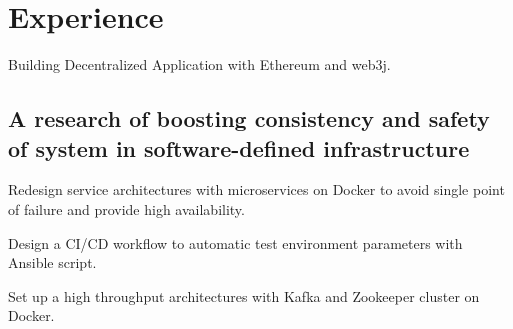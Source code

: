 \documentclass[]{deedy-resume-openfont}
\begin{document}
%
%
\lastupdated

%
%

%
%

\begin{minipage}[t]{0.45\textwidth}



\section{Experience}

\vspace{\topsep} %
\begin{tightemize}
    \item Building Decentralized Application with Ethereum and web3j.
\end{tightemize}
\sectionsep

\subsection{A research of boosting consistency and safety of system in software-defined infrastructure}
\begin{tightemize}
    \item Redesign service architectures with microservices on Docker to avoid single point of failure and provide high availability.
    \item Design a CI/CD workflow to automatic test environment parameters with Ansible script.
    \item Set up a high throughput architectures with Kafka and Zookeeper cluster on Docker.
\end{tightemize}
\sectionsep


\end{minipage}
\end{document}

